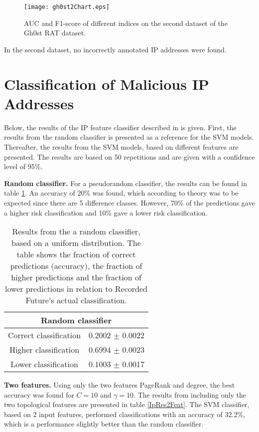 \begin{figure}[h!]
    \centering
    \texttt{[image: gh0st2Chart.eps]}
    \caption{AUC and F1-score of different indices on the second dataset of the Gh0st RAT dataset.}
    \label{gh0stChart2}
\end{figure}

In the second dataset, no incorrectly annotated IP addresses were found. 

\nopagebreak
\FloatBarrier
\section{Classification of Malicious IP Addresses}
Below, the results of the IP feature classifier described in  is given. First, the results from the random classifier is presented as a reference for the SVM models. Thereafter, the results from the SVM models, based on different features are presented. The results are based on 50 repetitions and are given with a confidence level of 95\%.

\textbf{Random classifier.} For a pseudorandom classifier, the results can be found in table \ref{randClass}. An accuracy of 20\% was found, which according to theory was to be expected since there are 5 difference classes. However, 70\% of the predictions gave a higher risk classification and 10\% gave a lower risk classification.

\begin{table}[h!]
    \centering
    \caption{Results from the a random classifier, based on a uniform distribution. The table shows the fraction of correct predictions (accuracy), the fraction of higher predictions and the fraction of lower predictions in relation to Recorded Future's actual classification.}
    \begin{tabular}{|c|c|}
    \hline
        \multicolumn{2}{|c|}{Random classifier}\\ \hline
        Correct classification & 0.2002 $\pm$ 0.0022 \\
        Higher classification  & 0.6994 $\pm$ 0.0023\\
        Lower classification   & 0.1003 $\pm$ 0.0017\\ \hline
    \end{tabular}
    \label{randClass}
\end{table}



\textbf{Two features.} Using only the two features PageRank and degree, the best accuracy was found for $C=10$ and $\gamma=10$. The results from including only the two topological features are presented in table \ref{IpRes2Feat}. The SVM classifier, based on 2 input features, performed classifications with an accuracy of 32.2\%, which is a performance slightly better than the random classifier.

